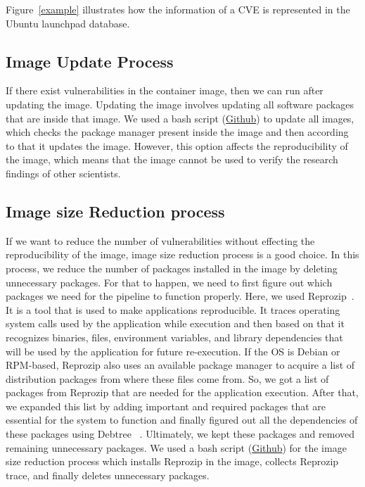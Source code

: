 \documentclass[a4paper,num-refs]{oup-contemporary}
\begin{document}
Figure~\ref{example} illustrates how the information of a CVE is represented
in the Ubuntu launchpad database.

\subsection{Image Update Process}

If there exist vulnerabilities in the container image, then we can
run after updating the
image. Updating the image involves updating all software packages that are
inside that image. We used a bash script (\href{https://github.com/kaurbhupinder/Vulnerability-Analysis}{Github}) 
to update all images, which checks the
package manager present inside the image and then according to that it
updates the image. However, this option affects the reproducibility
of the image, which means that the image cannot be used to verify the research
findings of other scientists.

\subsection{Image size Reduction process}
If we want to reduce the number of vulnerabilities without effecting the reproducibility of the image,
image size reduction process is a good choice. In this process, we reduce the number of packages
installed in the image by deleting unnecessary packages. For that to happen, we need to first figure
out which packages we need for the pipeline to function properly. Here, we used 
Reprozip~\cite{rampin2016reprozip}. It is a tool that
is used to make applications reproducible. It traces operating system calls used by the
application while execution and then based on that it recognizes binaries, files, environment variables,
and library dependencies that will be used by the application for future re-execution. If the OS is
Debian or RPM-based, Reprozip also
uses an available package manager to acquire a list of distribution packages from where these files come from.
So, we got a list of packages from Reprozip that are needed for the application execution. 
After that, we expanded this list by adding important and required packages that are essential
for the system to function and finally figured out all the dependencies of these packages using Debtree
~\cite{debtree}.
Ultimately, we kept these packages and removed remaining unnecessary packages. We used a bash script
(\href{https://github.com/kaurbhupinder/Vulnerability-Analysis/blob/master/Scripts/script.sh}{Github}) for
the image size reduction process which installs Reprozip in the image, collects Reprozip trace, and
finally deletes unnecessary packages.
\end{document}
